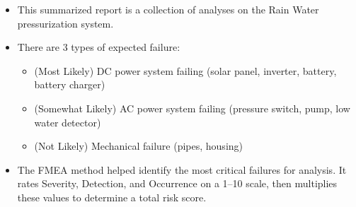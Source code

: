 \documentclass[12pt]{article}
\begin{document}
\begin{itemize}
    \item This summarized report is a collection of analyses on the Rain Water pressurization system.
    \item There are 3 types of expected failure:
    \begin{itemize}
        \item (Most Likely) DC power system failing (solar panel, inverter, battery, battery charger)
        \item (Somewhat Likely) AC power system failing (pressure switch, pump, low water detector)
        \item (Not Likely) Mechanical failure (pipes, housing)
    \end{itemize}
    \item The FMEA method helped identify the most critical failures for analysis. It rates Severity, Detection, and Occurrence on a 1--10 scale, then multiplies these values to determine a total risk score.
    

\end{itemize}
\end{document}
